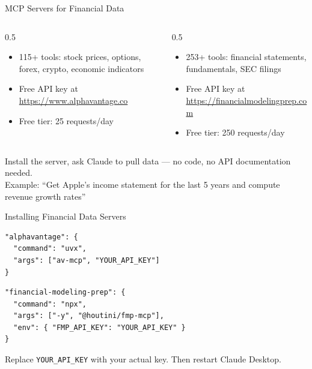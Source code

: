 \documentclass[aspectratio=169]{beamer}
\begin{document}
\begin{frame}[fragile]{MCP Servers for Financial Data}
\begin{columns}[T]
\begin{column}{0.5\textwidth}
\begin{shadedbox}[title=\textbf{Alpha Vantage}]
\begin{itemize}\small
  \item 115+ tools: stock prices, options, forex, crypto, economic indicators
  \item Free API key at \url{https://www.alphavantage.co}
  \item \alert{Free tier}: 25 requests/day
\end{itemize}
\end{shadedbox}
\end{column}
\begin{column}{0.5\textwidth}
\begin{shadedbox}[title=\textbf{Financial Modeling Prep}]
\begin{itemize}\small
  \item 253+ tools: financial statements, fundamentals, SEC filings
  \item Free API key at \url{https://financialmodelingprep.com}
  \item \alert{Free tier}: 250 requests/day
\end{itemize}
\end{shadedbox}
\end{column}
\end{columns}
\vspace{0.3cm}
\begin{center}\small
Install the server, ask Claude to pull data --- \alert{no code, no API documentation needed}.\\[0.3em]
Example: ``Get Apple's income statement for the last 5 years and compute revenue growth rates''
\end{center}
\end{frame}

\begin{frame}[fragile]{Installing Financial Data Servers}
\begin{shadedbox}[title=\textbf{Alpha Vantage}]
\begin{verbatim}
"alphavantage": {
  "command": "uvx",
  "args": ["av-mcp", "YOUR_API_KEY"]
}
\end{verbatim}
\end{shadedbox}
\vspace{0.2cm}
\begin{shadedbox}[title=\textbf{Financial Modeling Prep}]
\begin{verbatim}
"financial-modeling-prep": {
  "command": "npx",
  "args": ["-y", "@houtini/fmp-mcp"],
  "env": { "FMP_API_KEY": "YOUR_API_KEY" }
}
\end{verbatim}
\end{shadedbox}
\vspace{0.2cm}
\begin{center}\small
Replace \texttt{YOUR\_API\_KEY} with your actual key. Then restart Claude Desktop.
\end{center}
\end{frame}
\end{document}
